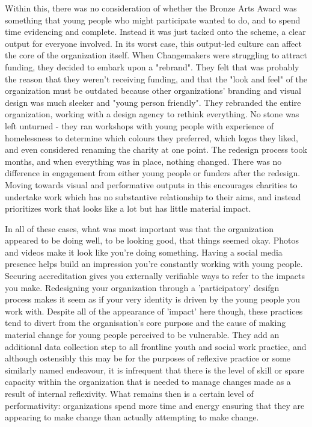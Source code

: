 Within this, there was no consideration of whether the Bronze Arts Award was something that young people who might participate wanted to do, and to spend time evidencing and complete. Instead it was just tacked onto the scheme, a clear output for everyone involved.
In its worst case, this output-led culture can affect the core of the organization itself. When Changemakers were struggling to attract funding, they decided to embark upon a "rebrand". They felt that was probably the reason that they weren't receiving funding, and that the "look and feel" of the organization must be outdated because other organizations' branding and visual design was much sleeker and "young person friendly". They rebranded the entire organization, working with a design agency to rethink everything. No stone was left unturned - they ran workshops with young people with experience of homelessness to determine which colours they preferred, which logos they liked, and even considered renaming the charity at one point. The redesign process took months, and when everything was in place, nothing changed. There was no difference in engagement from either young people or funders after the redesign. Moving towards visual and performative outputs in this encourages charities to undertake work which has no substantive relationship to their aims, and instead prioritizes work that looks like a lot but has little material impact.

In all of these cases, what was most important was that the organization appeared to be doing well, to be looking good, that things seemed okay. Photos and videos make it look like you're doing something. Having a social media presence helps build an impression you're constantly working with young people. Securing accreditation gives you externally verifiable ways to refer to the impacts you make. Redesigning your organization through a 'participatory' desifgn process makes it seem as if your very identity is driven by the young people you work with. Despite all of the appearance of 'impact' here though, these practices tend to divert from the organisation's core purpose and the cause of making material change for young people perceived to be vulnerable. They add an additional data collection step to all frontline youth and social work practice, and although ostensibly this may be for the purposes of reflexive practice or some similarly named endeavour, it is infrequent that there is the level of skill or spare capacity within the organization that is needed to manage changes made as a result of internal reflexivity. What remains then is a certain level of performativity: organizations spend more time and energy ensuring that they are appearing to make change than actually attempting to make change.

